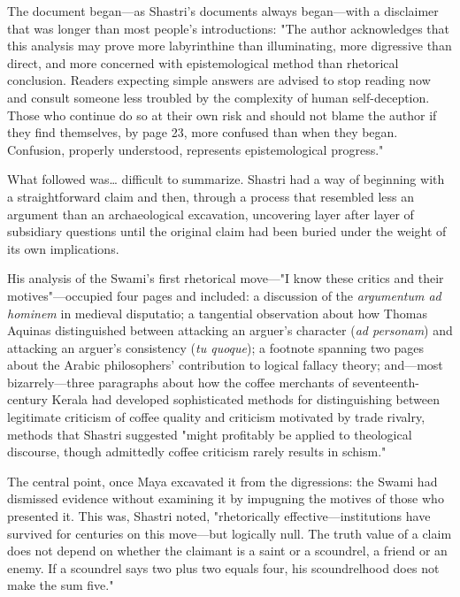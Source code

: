 \documentclass[12pt,twoside]{book}
\begin{document}
The document began—as Shastri's documents always began—with a disclaimer that was longer than most people's introductions: "The author acknowledges that this analysis may prove more labyrinthine than illuminating, more digressive than direct, and more concerned with epistemological method than rhetorical conclusion. Readers expecting simple answers are advised to stop reading now and consult someone less troubled by the complexity of human self-deception. Those who continue do so at their own risk and should not blame the author if they find themselves, by page 23, more confused than when they began. Confusion, properly understood, represents epistemological progress."

What followed was\ldots{} difficult to summarize. Shastri had a way of beginning with a straightforward claim and then, through a process that resembled less an argument than an archaeological excavation, uncovering layer after layer of subsidiary questions until the original claim had been buried under the weight of its own implications.

His analysis of the Swami's first rhetorical move—"I know these critics and their motives"—occupied four pages and included: a discussion of the \emph{argumentum ad hominem} in medieval disputatio; a tangential observation about how Thomas Aquinas distinguished between attacking an arguer's character (\emph{ad personam}) and attacking an arguer's consistency (\emph{tu quoque}); a footnote spanning two pages about the Arabic philosophers' contribution to logical fallacy theory; and—most bizarrely—three paragraphs about how the coffee merchants of seventeenth-century Kerala had developed sophisticated methods for distinguishing between legitimate criticism of coffee quality and criticism motivated by trade rivalry, methods that Shastri suggested "might profitably be applied to theological discourse, though admittedly coffee criticism rarely results in schism."

The central point, once Maya excavated it from the digressions: the Swami had dismissed evidence without examining it by impugning the motives of those who presented it. This was, Shastri noted, "rhetorically effective—institutions have survived for centuries on this move—but logically null. The truth value of a claim does not depend on whether the claimant is a saint or a scoundrel, a friend or an enemy. If a scoundrel says two plus two equals four, his scoundrelhood does not make the sum five."
\end{document}
